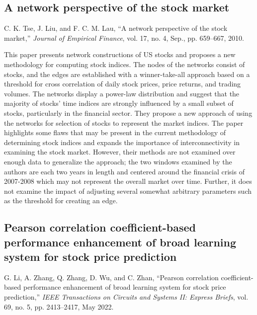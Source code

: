 \documentclass[12pt]{article}
\begin{document}
\subsection{A network perspective of the stock market}
C. K. Tse, J. Liu, and F. C. M. Lau, “A network perspective of the stock market,” \textit{Journal of Empirical Finance}, vol. 17, no. 4, Sep., pp. 659–667, 2010. %
\newline

This paper presents network constructions of US stocks and proposes a new methodology for computing stock indices. The nodes of the networks consist of stocks, and the edges are established with a winner-take-all approach based on a threshold for cross correlation of daily stock prices, price returns, and trading volumes. The networks display a power-law distribution and suggest that the majority of stocks' time indices are strongly influenced by a small subset of stocks, particularly in the financial sector. They propose a new approach of using the networks for selection of stocks to represent the market indices. The paper highlights some flaws that may be present in the current methodology of determining stock indices and expands the importance of interconnectivity in examining the stock market. However, their methods are not examined over enough data to generalize the approach; the two windows examined by the authors are each two years in length and centered around the financial crisis of 2007-2008 which may not represent the overall market over time. Further, it does not examine the impact of adjusting several somewhat arbitrary parameters such as the threshold for creating an edge.


\subsection{Pearson correlation coefficient-based performance enhancement of broad learning system for stock price prediction}
G. Li, A. Zhang, Q. Zhang, D. Wu, and C. Zhan, “Pearson correlation coefficient-based performance enhancement of broad learning system for stock price prediction,” \textit{IEEE Transactions on Circuits and Systems II: Express Briefs}, vol. 69, no. 5, pp. 2413–2417, May 2022. %
\newline
\end{document}
